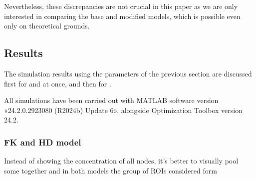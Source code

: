 \documentclass{article}
\begin{document}
                Nevertheless, these discrepancies are not crucial in this paper as we are only interested in comparing the base and modified models, which is possible even only on theoretical grounds.

        \subsection{Results}\label{secResults}

            The simulation results using the parameters of the previous section are discussed first for \FKdiscrete{} and \HDdiscrete{} at once, and then for \SMOdiscrete{}.

            All simulations have been carried out with MATLAB software version «24.2.0.2923080 (R2024b) Update 6», alongside Optimization Toolbox version 24.2.


            \subsubsection{FK and HD model}\label{secResultsFKHD}

                Instead of showing the concentration of all nodes, it's better to visually pool some together and in both models the group of ROIs considered form
\end{document}
